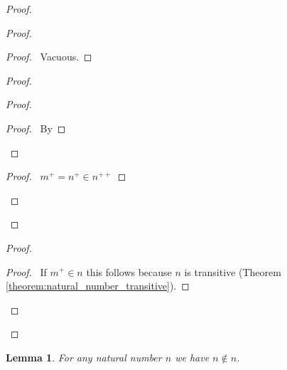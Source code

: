 \documentclass{report}
\let\qed\relax
\newtheorem{lemma}[axiom]{Lemma}
\theoremstyle{definition}
\begin{document}
    \begin{proof}
        \pf
        \begin{proof}
            \begin{proof}
                \pf\ Vacuous.
            \end{proof}
            \begin{proof}
                \begin{proof}
                    \begin{proof}
                        \pf\ By 
                    \end{proof}
                \end{proof}
                \begin{proof}
                    \pf\ $m^+ = n^+ \in n^{++}$
                \end{proof}
            \end{proof}
        \end{proof}
        \begin{proof}
            \begin{proof}
                \pf\ If $m^+ \in n$ this follows because $n$ is transitive (Theorem \ref{theorem:natural_number_transitive}).
            \end{proof}
        \end{proof}
        \qed
    \end{proof}

    \begin{lemma}
        \label{lemma:natural_number_irreflexive}
        For any natural number $n$ we have $n \notin n$.
    \end{lemma}
\end{document}
